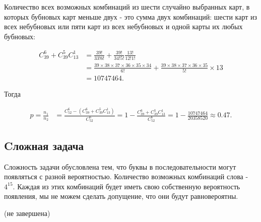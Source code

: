 \documentclass[a4paper,11pt]{article}
\begin{document}
Количество всех возможных комбинаций из шести случайно выбранных карт, в которых бубновых карт меньше двух - это сумма двух комбинаций: шести карт из всех небубновых или пяти карт из всех небубновых и одной карты их любых бубновых:

\begin{equation*}
\begin{split}
C^{6}_{39} + C^{5}_{39} C^{1}_{13} & = \frac{39!}{33!6!} + \frac{39!}{34!5!} \frac{13!}{12!1!} \\
& = \frac{39 \times 38 \times 37 \times 36 \times 35 \times 34 }{6!} +
  \frac{39 \times 38 \times 37 \times 36 \times 35}{5!} \times 13 \\
& = 10747464.
\end{split}
\end{equation*}

Тогда

\begin{equation*}
\begin{split}
p = \frac{n_1}{n_2} & = \frac{C^6_{52} - (C^{6}_{39} + C^{5}_{39} C^{1}_{13})}{C^6_{52}} 
  = 1 - \frac{C^{6}_{39} + C^{5}_{39} C^{1}_{13}}{C^6_{52}} = 1 - \frac{10747464}{20358520}
\approx 0.47.
\end{split}
\end{equation*}

\subsection{Cложная задача}

Сложность задачи обусловлена тем, что буквы в последовательности могут появляться с разной вероятностью. Количество возможных комбинаций слова - $4^{15}$. Каждая из этих комбинаций будет иметь свою собственную вероятность появления, мы не можем сделать допущение, что они будут равновероятны.

(не завершена)

\end{document}
